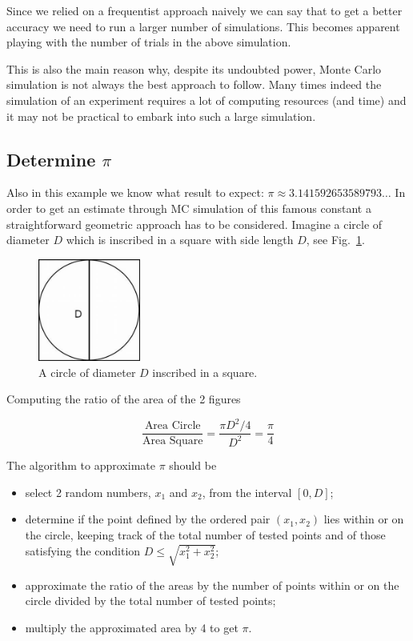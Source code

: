Since we relied on a frequentist approach naively we can say that to
get a better accuracy we need to run a larger number of simulations.
This becomes apparent playing with the number of trials in the above 
simulation. 

This is also the main reason why, despite its undoubted power, Monte Carlo simulation is not always the best approach to follow.
Many times indeed the simulation of an experiment requires a lot of computing resources (and time) and it may not be practical to embark into such a large simulation.

\subsection{Determine \(\pi\)}\label{determine-pi}

Also in this example we know what result to expect:
\(\pi\approx 3.141592653589793\ldots\) In order to get an estimate through MC
simulation of this famous constant a straightforward geometric approach has to be considered. Imagine a circle of diameter \(D\) which is inscribed in a square with side length \(D\), see Fig.~\ref{fig:circle_inscribed}.

\begin{figure}[htb]
	\centering
	\includegraphics[width=0.3\textwidth]{figures/circle_inscribed.jpeg}
	\caption{A circle of diameter $D$ inscribed in a square.}
	\label{fig:circle_inscribed}
\end{figure}

Computing the ratio of the area of the 2 figures

\begin{equation}
\frac{\textrm{Area Circle}}{\textrm{Area Square}} = \frac{\pi D^2/4}{D^2} = \frac{\pi}{4} 
\end{equation}

The algorithm to approximate \(\pi\) should be

\begin{itemize}
\item select 2 random numbers, \(x_1\) and \(x_2\), from the interval
\([0,D]\); 
\item determine if the point defined by the ordered pair
\((x_1, x_2)\) lies within or on the circle, keeping track of the total number of
tested points and of those satisfying the condition \(D \le\sqrt{x_1^2 + x_2^2}\); 
\item approximate the ratio of the areas by the number of points within or on
the circle divided by the total number of tested points; 
\item multiply the approximated area by 4 to get \(\pi\).
\end{itemize}

